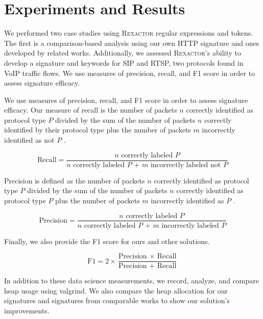 \section{Experiments and Results}

We performed two case studies using \textsc{Rexactor} regular expressions and tokens. The first is a comparison-based analysis using our own HTTP signature and ones developed by related works. Additionally, we assessed \textsc{Rexactor}'s ability to develop a signature and keywords for SIP and RTSP, two protocols found in VoIP traffic flows. We use measures of precision, recall, and F1 score in order to assess signature efficacy.

We use measures of precision, recall, and F1 score in order to assess signature efficacy. Our measure of recall is the number of packets $n$ correctly identified as protocol type $P$ divided by the sum of the number of packets $n$ correctly identified by their protocol type plus the number of packets $m$ incorrectly identified as not $P$ \cite{Zhang}.

\vspace{\baselineskip}
\[\text{Recall} = \frac{\text{$n$ correctly labeled $P$}}{\text{$n$ correctly labeled $P$ + $m$ incorrectly labeled not $P$}}\] \par
\vspace{\baselineskip}

Precision is defined as the number of packets $n$ correctly identified as protocol type $P$ divided by the sum of the number of packets $n$ correctly identified as protocol type $P$ plus the number of packets $m$ incorrectly identified as $P$ \cite{Zhang}.

\vspace{\baselineskip}
\[\text{Precision} = \frac{\text{$n$ correctly labeled $P$}}{\text{$n$ correctly labeled $P$ + $m$ incorrectly labeled $P$}}\] \par
\vspace{\baselineskip}

Finally, we also provide the F1 score for ours and other solutions.

\vspace{\baselineskip}
\[\text{F1} = 2 \times \frac{\text{Precision $\times$ Recall}}{\text{Precision + Recall}}\] \par
\vspace{\baselineskip}

In addition to these data science measurements, we record, analyze, and compare heap usage using valgrind. We also compare the heap allocation for our signatures and signatures from comparable works to show our solution's improvements.

